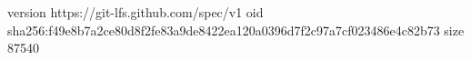 version https://git-lfs.github.com/spec/v1
oid sha256:f49e8b7a2ce80d8f2fe83a9de8422ea120a0396d7f2c97a7cf023486e4c82b73
size 87540
